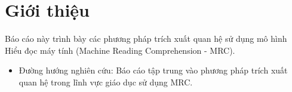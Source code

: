 \section{Giới thiệu}\label{sec:gioi-thieu}
Báo cáo này trình bày các phương pháp trích xuất quan hệ sử dụng mô hình Hiểu đọc máy tính (Machine Reading Comprehension - MRC).
\begin{itemize}
    \item Đường hướng nghiên cứu: Báo cáo tập trung vào phương pháp trích xuất quan hệ trong lĩnh vực giáo dục sử dụng MRC.
\end{itemize}

